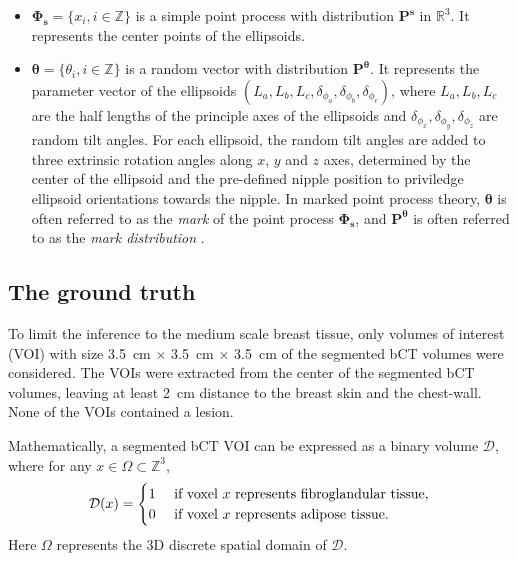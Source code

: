 \documentclass[journal]{IEEEtran}
\begin{document}
\begin{itemize}

\item $\mathbf{\Phi_s} = \{x_i, i \in \mathbb{Z} \}$ is a simple point
  process with distribution $\mathbf{P}^{\mathbf{s}}$ in
  $\mathbb{R}^{3}$. It represents the center points of the ellipsoids.

\item $\boldsymbol{\theta} = \{ \theta_i, i \in \mathbb{Z} \}$ is a
  random vector with distribution
  $\mathbf{P}^{\boldsymbol{\theta}}$. It represents the parameter
  vector of the ellipsoids
  $\left( L_a, L_b, L_c, \delta_{\phi_a}, \delta_{\phi_b},
    \delta_{\phi_c} \right)$, where $L_a, L_b, L_c$ are the half
  lengths of the principle axes of the ellipsoids and
  $\delta_{\phi_{x}},\delta_{\phi_{y}},\delta_{\phi_{z}}$ are random
  tilt angles. For each ellipsoid, the random tilt angles are added to
  three extrinsic rotation angles along $x$, $y$ and $z$ axes,
  determined by the center of the ellipsoid and the pre-defined nipple
  position to priviledge ellipsoid orientations towards the nipple. In
  marked point process theory, $\boldsymbol{\theta}$ is often referred
  to as the \textit{mark} of the point process $\mathbf{\Phi_s}$, and
  $\mathbf{P}^{\boldsymbol{\theta}}$ is often referred to as the
  \textit{mark distribution} \cite{chiu2013stochastic}.
\end{itemize}

\subsection{The ground truth}
\label{sec:ground-truth}

To limit the inference to the medium scale breast tissue, only volumes
of interest (VOI) with size \SI{3.5}{\cm} $\times$ \SI{3.5}{\cm}
$\times$ \SI{3.5}{\cm} of the segmented bCT volumes were
considered. The VOIs were extracted from the center of the segmented
bCT volumes, leaving at least \SI{2}{\cm} distance to the breast skin
and the chest-wall. None of the VOIs contained a lesion.

Mathematically, a segmented bCT VOI can be expressed as a binary
volume $\mathcal{D}$, where for any
$x \in \Omega \subset \mathbb{Z}^3$,
\begin{equation}
  \label{eq:bct-discrete-form}
  \mathcal{D}(x) =
  \begin{cases}
    1 & \textnormal{ if voxel } x \textnormal{ represents
      fibroglandular tissue}, \\
    0 & \textnormal{ if voxel } x \textnormal{ represents
      adipose tissue}. \\
  \end{cases}
\end{equation}
Here $\Omega$ represents the 3D discrete spatial domain of
$\mathcal{D}$.
\end{document}
